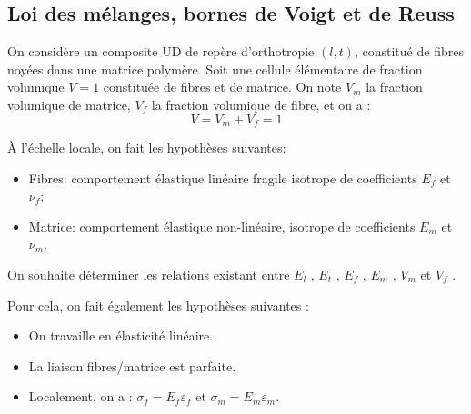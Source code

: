 \medskip
\subsection{Loi des mélanges, bornes de Voigt et de Reuss}

On considère un composite UD de repère d'orthotropie $(l,t)$, constitué de fibres noyées dans 
une matrice polymère. Soit une cellule élémentaire de fraction volumique $V = 1$ constituée de 
fibres et de matrice. On note
$V_m$ la fraction volumique de matrice, 
$V_f$ la fraction volumique de fibre, et on a :
\begin{equation} V = V_m + V_f =1 \end{equation}

\medskip
À l'échelle locale, on fait les hypothèses suivantes:
\begin{itemize}
   \item Fibres: comportement élastique linéaire fragile isotrope de coefficients $E_f$ et $\nu_f$;
   \item Matrice: comportement élastique non-linéaire, isotrope de coefficients $E_m$ et $\nu_m$.
\end{itemize}

\medskip
On souhaite déterminer les relations existant entre $E_l$ , $E_t$ , $E_f$ , $E_m$ , $V_m$ et $V_f$ .

\medskip
Pour cela, on fait également les hypothèses suivantes :
\begin{itemize}
   \item On travaille en élasticité linéaire.
   \item La liaison fibres/matrice est parfaite.
   \item Localement, on a : $\sigma_f = E_f \varepsilon_f$  et $\sigma_m = E_m \varepsilon_m$.
\end{itemize}


